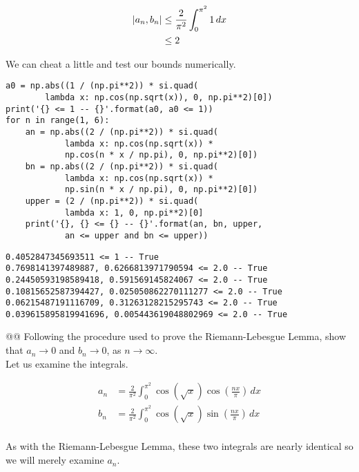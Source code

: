 \documentclass[10pt]{article}
\begin{document}
\begin{easylist}[enumerate]
    \begin{align*}
        \left\lvert a_n, b_n \right\rvert &\le \frac{2}{\pi^2} \int_0^{\pi^2} 1 \, dx\\
        & \le 2
    \end{align*}

    We can cheat a little and test our bounds numerically.

\weave

\begin{verbatim}
a0 = np.abs((1 / (np.pi**2)) * si.quad(
        lambda x: np.cos(np.sqrt(x)), 0, np.pi**2)[0])
print('{} <= 1 -- {}'.format(a0, a0 <= 1))
for n in range(1, 6):
    an = np.abs((2 / (np.pi**2)) * si.quad(
            lambda x: np.cos(np.sqrt(x)) *
            np.cos(n * x / np.pi), 0, np.pi**2)[0])
    bn = np.abs((2 / (np.pi**2)) * si.quad(
            lambda x: np.cos(np.sqrt(x)) *
            np.sin(n * x / np.pi), 0, np.pi**2)[0])
    upper = (2 / (np.pi**2)) * si.quad(
            lambda x: 1, 0, np.pi**2)[0]
    print('{}, {} <= {} -- {}'.format(an, bn, upper,
            an <= upper and bn <= upper))
\end{verbatim}
\begin{verbatim}
0.4052847345693511 <= 1 -- True
0.7698141397489887, 0.6266813971790594 <= 2.0 -- True
0.24450593198589418, 0.591569145824067 <= 2.0 -- True
0.10815652587394427, 0.025050862270111277 <= 2.0 -- True
0.06215487191116709, 0.31263128215295743 <= 2.0 -- True
0.039615895819941696, 0.005443619048802969 <= 2.0 -- True

\end{verbatim}

\noweave

    @@ Following the procedure used to prove the Riemann-Lebesgue Lemma, show that $a_n \to 0$ and $b_n \to 0$, as
    $n\to\infty.$\\

    Let us examine the integrals.

    \begin{align*}
        a_n &= \frac{2}{\pi^2} \int_0^{\pi^2} \cos(\sqrt{x}) \cos\left(\frac{nx}{\pi}\right) \, dx\\
        b_n &= \frac{2}{\pi^2} \int_0^{\pi^2} \cos(\sqrt{x}) \sin\left(\frac{nx}{\pi}\right) \, dx\\
    \end{align*}

    As with the Riemann-Lebesgue Lemma, these two integrals are nearly identical so we will merely examine $a_n$.


\end{easylist}
\end{document}
